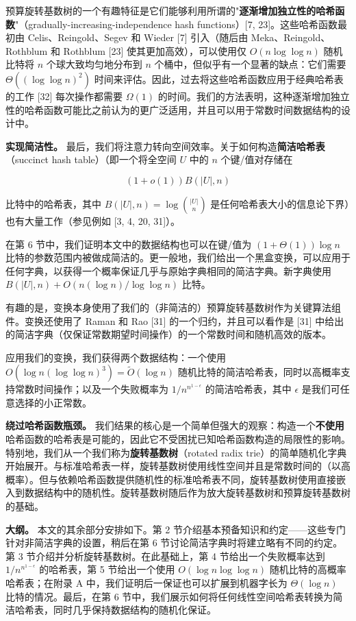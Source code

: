 \documentclass[12pt,a4paper]{ctexart}
\theoremstyle{remark}
\begin{document}
预算旋转基数树的一个有趣特征是它们能够利用所谓的"\textbf{逐渐增加独立性的哈希函数}"（gradually-increasing-independence hash functions）[7, 23]。这些哈希函数最初由 Celis、Reingold、Segev 和 Wieder [7] 引入（随后由 Meka、Reingold、Rothblum 和 Rothblum [23] 使其更加高效），可以使用仅 $O(n\log\log n)$ 随机比特将 $n$ 个球大致均匀地分布到 $n$ 个桶中，但似乎有一个显著的缺点：它们需要 $\Theta((\log\log n)^2)$ 时间来评估。因此，过去将这些哈希函数应用于经典哈希表的工作 [32] 每次操作都需要 $\Omega(1)$ 的时间。我们的方法表明，这种逐渐增加独立性的哈希函数可能比之前认为的更广泛适用，并且可以用于常数时间数据结构的设计中。

\textbf{实现简洁性。} 最后，我们将注意力转向空间效率。关于如何构造\textbf{简洁哈希表}（succinct hash table）（即一个将全空间 $U$ 中的 $n$ 个键/值对存储在

$$(1+o(1))B(|U|,n)$$

比特中的哈希表，其中 $B(|U|,n)=\log\binom{|U|}{n}$ 是任何哈希表大小的信息论下界）也有大量工作（参见例如 [3, 4, 20, 31]）。

在第 6 节中，我们证明本文中的数据结构也可以在键/值为 $(1+\Theta(1))\log n$ 比特的参数范围内被做成简洁的。更一般地，我们给出一个黑盒变换，可以应用于任何字典，以获得一个概率保证几乎与原始字典相同的简洁字典。新字典使用 $B(|U|,n)+O(n(\log n)/\log\log n)$ 比特。

有趣的是，变换本身使用了我们的（非简洁的）预算旋转基数树作为关键算法组件。变换还使用了 Raman 和 Rao [31] 的一个归约，并且可以看作是 [31] 中给出的简洁字典（仅保证常数期望时间操作）的一个常数时间和随机高效的版本。

应用我们的变换，我们获得两个数据结构：一个使用 $O(\log n(\log\log n)^3)=\tilde{O}(\log n)$ 随机比特的简洁哈希表，同时以高概率支持常数时间操作；以及一个失败概率为 $1/n^{n^{1-\epsilon}}$ 的简洁哈希表，其中 $\epsilon$ 是我们可任意选择的小正常数。

\textbf{绕过哈希函数瓶颈。} 我们结果的核心是一个简单但强大的观察：构造一个\textbf{不使用}哈希函数的哈希表是可能的，因此它不受困扰已知哈希函数构造的局限性的影响。特别地，我们从一个我们称为\textbf{旋转基数树}（rotated radix trie）的简单随机化字典开始展开。与标准哈希表一样，旋转基数树使用线性空间并且是常数时间的（以高概率）。但与依赖哈希函数提供随机性的标准哈希表不同，旋转基数树使用直接嵌入到数据结构中的随机性。旋转基数树随后作为放大旋转基数树和预算旋转基数树的基础。

\textbf{大纲。} 本文的其余部分安排如下。第 2 节介绍基本预备知识和约定——这些专门针对非简洁字典的设置，稍后在第 6 节讨论简洁字典时将建立略有不同的约定。第 3 节介绍并分析旋转基数树。在此基础上，第 4 节给出一个失败概率达到 $1/n^{n^{1-\epsilon}}$ 的哈希表，第 5 节给出一个使用 $O(\log n \log\log n)$ 随机比特的高概率哈希表；在附录 A 中，我们证明后一保证也可以扩展到机器字长为 $\Theta(\log n)$ 比特的情况。最后，在第 6 节中，我们展示如何将任何线性空间哈希表转换为简洁哈希表，同时几乎保持数据结构的随机化保证。
\end{document}
